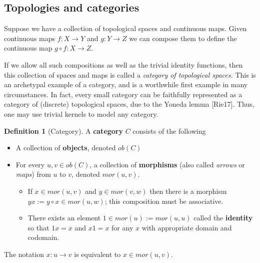 \documentclass[12pt]{amsart}
\theoremstyle{definition}
\newtheorem{definition}[theorem]{Definition}
\numberwithin{equation}{section}
\begin{document}
\subsection{Topologies and categories}
Suppose we have a collection of topological spaces and continuous maps. Given continuous maps $f: X \rightarrow Y$ and $g: Y \rightarrow Z$ we can compose them to define the continuous map $g \circ f: X\rightarrow Z$. 
\begin{center} \end{center}
If we allow all such compositions as well as the trivial identity functions, then this collection of spaces and maps is called a \textit{category of topological spaces.} This is an archetypal example of a category, and is a worthwhile first example in many circumstances. In fact, every small category can be faithfully represented as a category of (discrete) topological spaces, due to the Yoneda lemma [Rie17]. Thus, one may use trivial kernels to model any category.

\begin{definition}[Category]
    A \textbf{category} $C$ consists of the following 
    \begin{itemize}
    \item A collection of \textbf{objects}, denoted $ob(C)$
    \item For every $u, v\in ob(C)$, a collection of \textbf{morphisms} (also called \textit{arrows} or \textit{maps}) from $u$ to $v$, denoted $mor(u, v)$. 
    \begin{itemize}
        \item If $x \in mor(u, v)$ and $y\in mor(v, w)$ then there is a morphism $yx := y\circ x \in mor(u, w)$; this composition must be associative. 
        \item There exists an element $1 \in mor(u) := mor(u,u)$ called the \textbf{identity} so that $1x = x$ and $x1 =x$ for any $x$ with appropriate domain and codomain. 
    \end{itemize}
    \end{itemize} 

    The notation $x: u \rightarrow v$ is equivalent to $x \in mor(u,v)$. 
\end{definition}
\end{document}
